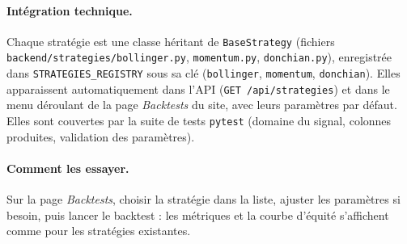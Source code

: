 \documentclass[11pt,a4paper]{article}
\newcommand{\code}[1]{\texttt{#1}}
\begin{document}
\paragraph{Intégration technique.} Chaque stratégie est une classe héritant de
\code{BaseStrategy} (fichiers \code{backend/strategies/bollinger.py},
\code{momentum.py}, \code{donchian.py}), enregistrée dans
\code{STRATEGIES\_REGISTRY} sous sa clé (\code{bollinger}, \code{momentum},
\code{donchian}). Elles apparaissent automatiquement dans l'API
(\code{GET /api/strategies}) et dans le menu déroulant de la page \emph{Backtests}
du site, avec leurs paramètres par défaut. Elles sont couvertes par la suite de
tests \code{pytest} (domaine du signal, colonnes produites, validation des
paramètres).

\paragraph{Comment les essayer.} Sur la page \emph{Backtests}, choisir la
stratégie dans la liste, ajuster les paramètres si besoin, puis lancer le
backtest : les métriques et la courbe d'équité s'affichent comme pour les
stratégies existantes.
\end{document}

